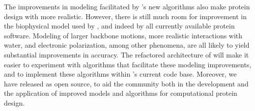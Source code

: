 The improvements in modeling facilitated by 's new algorithms also make protein design with \osprey more realistic.  However, there is still much room for improvement in the biophysical model used by \osprey, and indeed by all currently available protein software.  Modeling of larger backbone motions, more realistic interactions with water, and electronic polarization, among other phenomena, are all likely to yield substantial improvements in accuracy.  The refactored architecture of  will make it easier to experiment with algorithms that facilitate these modeling improvements, and to implement these algorithms within \osprey's current code base.  Moreover, we have released  as open source, to aid the community both in the development and the application of improved models and algorithms for computational protein design.  



